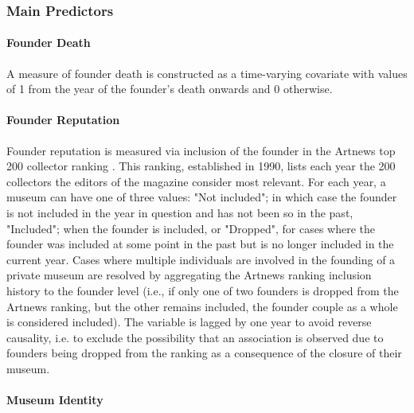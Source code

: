 \documentclass[12pt]{article}
\begin{document}
\subsubsection*{Main Predictors}


\paragraph*{Founder Death}

A measure of founder death is constructed as a time-varying covariate with values of 1 from the year of the founder's death onwards and 0 otherwise.
\paragraph*{Founder Reputation}


Founder reputation is measured via inclusion of the founder in the Artnews top 200 collector ranking \parencite{Artnews_ranking}.
This ranking, established in 1990, lists each year the 200 collectors the editors of the magazine consider most relevant.
For each year, a museum can have one of three values: "Not included"; in which case the founder is not included in the year in question and has not been so in the past, "Included"; when the founder is included, or "Dropped", for cases where the founder was included at some point in the past but is no longer included in the current year.
Cases where multiple individuals are involved in the founding of a private museum are resolved by aggregating the Artnews ranking inclusion history to the founder level (i.e., if only one of two founders is dropped from the Artnews ranking, but the other remains included, the founder couple as a whole is considered included).
The variable is lagged by one year to avoid reverse causality, i.e. to exclude the possibility that an association is observed due to founders being dropped from the ranking as a consequence of the closure of their museum.
\paragraph*{Museum Identity}
\end{document}
